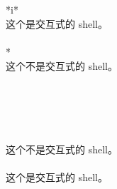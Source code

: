 \\
 \codePreProc{\$-} \\
\tab{}*i*\codeStatement{)}\\
\tab{}\tab{} 这个是交互式的 shell。\\
\tab{}\tab{}\codeStatement{;;}\\
\tab{}*\codeStatement{)}\\
\tab{}\tab{} 这个不是交互式的 shell。\\
\tab{}\tab{}\codeStatement{;;}\\
\\
\\
\\
\codeStatement{[}   \codeStatement{]}\codeStatement{;} \\
\tab{} 这个不是交互式的 shell。\\
\\
\tab{} 这个是交互式的 shell。\\

